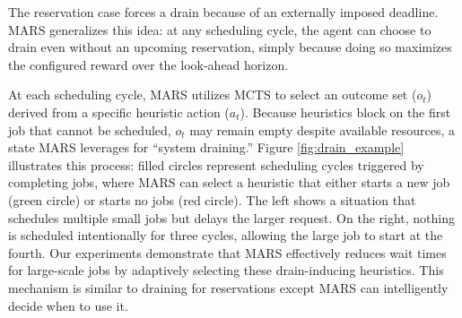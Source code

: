 \documentclass[conference]{IEEEtran}
\begin{document}

The reservation case forces a drain because of an externally imposed deadline. MARS generalizes this idea: at any scheduling cycle, the agent can choose to drain even without an upcoming reservation, simply because doing so maximizes the configured reward over the look-ahead horizon.

At each scheduling cycle, MARS utilizes MCTS to select an outcome set ($o_t$) derived from a specific heuristic action ($a_t$). Because heuristics block on the first job that cannot be scheduled, $o_t$ may remain empty despite available resources, a state MARS leverages for ``system draining.'' Figure \ref{fig:drain_example} illustrates this process: filled circles represent scheduling cycles triggered by completing jobs, where MARS can select a heuristic that either starts a new job (green circle) or starts no jobs (red circle). The left shows a situation that schedules multiple small jobs but delays the larger request. On the right, nothing is scheduled intentionally for three cycles, allowing the large job to start at the fourth. Our experiments demonstrate that MARS effectively reduces wait times for large-scale jobs by adaptively selecting these drain-inducing heuristics. This mechanism is similar to draining for reservations except MARS can intelligently decide when to use it.
\end{document}

